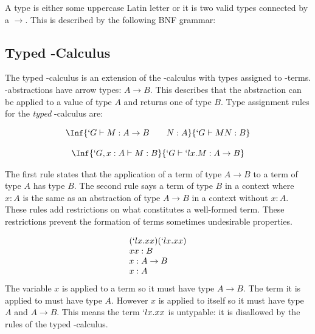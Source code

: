   A type is either some uppercase Latin letter or it is two valid types
  connected by a $\rightarrow$. This is described by the following
  BNF grammar:
  
  
  \subsection{Typed \lam-Calculus}
  The typed \lam-calculus is an extension of the \lam-calculus with types assigned to \lam-terms.
  \lam-abstractions have arrow types: $A \to B$.
  This describes that the abstraction can be applied to a value of type $A$ and returns one of type $B$.
  Type assignment rules for the \emph{typed} \lam-calculus are:

  \[
    \begin{array}{c}
    \Inf{
      `G \vdash M : A \to B \hspace{20pt} N:A 
    }{
      `G \vdash M N : B 
    }
    \\
    \\
    \Inf{
      `G,x:A \vdash M : B
    }{
      `G \vdash `lx.M : A \to B 
    }
    \end{array}
  \]

  The first rule states that the application of a term of type $A \to B$ to
  a term of type $A$ has type $B$. 
  The second rule says a term of type $B$ in a context where $x:A$ is the same as an abstraction of type $A \to B$ in a context without $x:A$. 
  These rules add restrictions on what constitutes a well-formed term.
  These restrictions prevent the formation of terms sometimes undesirable properties.  
  
  \begin{example}
  \[  
  \begin{array}{lr}
    (`lx.xx)(`lx.xx) \\
    xx : B \\
    x : A \to B \\
    x : A
  \end{array}
  \]
  The variable $x$ is applied to a term so it must have type $A \to B$.
  The term it is applied to must have type $A$.
  However $x$ is applied to itself so it must have type $A$ and $A \to B$.
  This means the term $`lx.xx$ is untypable:
  it is disallowed by the rules of the typed \lam-calculus.
  \end{example}
 

